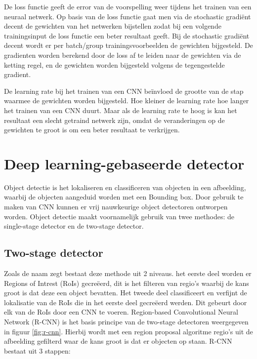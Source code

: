 De loss functie geeft de error van de voorspelling weer tijdens het trainen van een neuraal netwerk. 
Op basis van de loss functie gaat men via de stochastic gradi\"ent decent de gewichten van het netwerken bijstellen zodat bij een volgende trainingsinput de loss functie een beter resultaat geeft. 
Bij de stochastic gradi\"ent decent wordt er per batch/group trainingsvoorbeelden de gewichten bijgesteld. 
De gradienten worden berekend door de loss af te leiden naar de gewichten via de ketting regel, en de gewichten worden bijgesteld volgens de tegengestelde gradient. 

De learning rate bij het trainen van een CNN be\"invloed de grootte van de stap waarmee de gewichten worden bijgesteld.
Hoe kleiner de learning rate hoe langer het trainen van een CNN duurt.
Maar als de learning rate te hoog is kan het resultaat een slecht getraind netwerk zijn, omdat de veranderingen op de gewichten te groot is om een beter resultaat te verkrijgen.


\section{Deep learning-gebaseerde detector}
Object detectie is het lokaliseren en classificeren van objecten in een afbeelding, waarbij de objecten aangeduid worden met een Bounding box. 
Door gebruik te maken van CNN kunnen er vrij nauwkeurige object detectoren ontworpen worden. 
Object detectie maakt voornamelijk gebruik van twee methodes: de single-stage detector en de two-stage detector.

\subsection{Two-stage detector}
Zoals de naam zegt bestaat deze methode uit 2 niveaus. 
het eerste deel worden er Regions of Intrest (RoIs) gecre\"eerd, dit is het filteren van regio's waarbij de kans groot is dat deze een object bevatten. 
Het tweede deel classificeert en verfijnt de lokalisatie van de RoIs die in het eerste deel gecre\"eerd werden. 
Dit gebeurt door elk van de RoIs door een CNN te voeren. 
Region-based Convolutional Neural Network (R-CNN) is het basis principe van de two-stage detectoren weergegeven in figuur \ref{fig:r-cnn}. 
Hierbij wordt met een region proposal algoritme regio's uit de afbeelding gefilterd waar de kans groot is dat er objecten op staan.
R-CNN bestaat uit 3 stappen:
 
